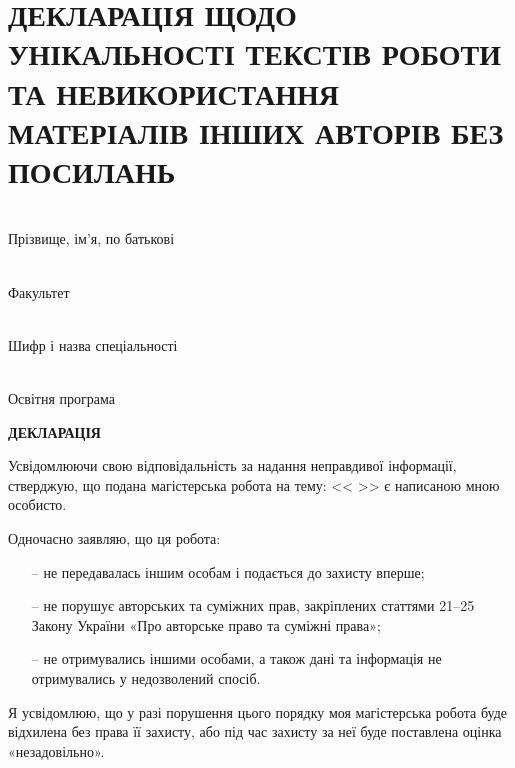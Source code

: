 \thispagestyle{empty}
\section*{ДЕКЛАРАЦІЯ ЩОДО УНІКАЛЬНОСТІ ТЕКСТІВ РОБОТИ ТА НЕВИКОРИСТАННЯ МАТЕРІАЛІВ ІНШИХ АВТОРІВ БЕЗ ПОСИЛАНЬ}

\vspace{2em}

\begin{minipage}[l]{0.5\linewidth}
	\hrulefill \\
	{\tiny{Прізвище, ім’я, по батькові}}

	\hrulefill \\
	{\tiny{Факультет}}

	\hrulefill \\
	{\tiny{Шифр і назва спеціальності}}

	\hrulefill \\
	{\tiny{Освітня програма}}
\end{minipage}

\vspace{2em}

\begin{center}
	\textbf{ДЕКЛАРАЦІЯ}
\end{center}

Усвідомлюючи свою відповідальність за надання неправдивої інформації,
стверджую, що подана магістерська робота на тему: <<\underline{\hspace{9cm}} \underline{\hspace{15cm}}>> є написаною мною особисто.

Одночасно заявляю, що ця робота:
\begin{itemize}
	\item[--] не передавалась іншим особам і подається до захисту вперше;
	\item[--] не порушує авторських та суміжних прав, закріплених статтями 21–25 Закону України «Про авторське право та суміжні права»;
	\item[--] не отримувались іншими особами, а також дані та інформація не отримувались у недозволений спосіб.
\end{itemize}

Я усвідомлюю, що у разі порушення цього порядку моя магістерська
робота буде відхилена без права її захисту, або під час захисту за неї буде
поставлена оцінка «незадовільно».

\vspace{2em}

